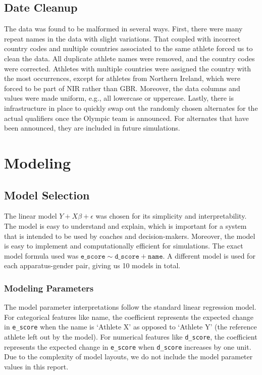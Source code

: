 \documentclass{article}
\begin{document}
\subsection{Date Cleanup}
The data was found to be malformed in several ways. First, there were many repeat 
names in the data with slight variations. That coupled with incorrect country codes 
and multiple countries associated to the same athlete forced us to clean the data. 
All duplicate athlete names were removed, and the country codes were corrected. 
Athletes with multiple countries were assigned the country with the most occurrences, 
except for athletes from Northern Ireland, which were forced to be part of NIR rather 
than GBR. Moreover, the data columns and values were made uniform, e.g., all lowercase 
or uppercase. Lastly, there is infrastructure in place to quickly swap out the randomly 
chosen alternates for the actual qualifiers once the Olympic team is announced. For 
alternates that have been announced, they are included in future simulations. 

\section{Modeling}\label{sec:modeling}

\subsection{Model Selection}
The linear model $Y + X\beta + \epsilon$ was chosen for its simplicity and interpretability. 
The model is easy to understand and explain, which is important for a system that is
intended to be used by coaches and decision-makers. Moreover, the model is easy to
implement and computationally efficient for simulations. The exact model formula used 
was $\texttt{e\_score} \sim \texttt{d\_score} + \texttt{name}$. A different model is 
used for each apparatus-gender pair, giving us 10 models in total.

\subsubsection{Modeling Parameters}
The model parameter interpretations follow the standard linear regression model. 
For categorical features like name, the coefficient represents the expected change 
in \texttt{e\_score} when the name is `Athlete X' as opposed to `Athlete Y' (the 
reference athlete left out by the model). For numerical features like \texttt{d\_score},
the coefficient represents the expected change in \texttt{e\_score} when \texttt{d\_score} increases 
by one unit. Due to the complexity of model layouts, we do not include the model 
parameter values in this report. 
\end{document}
